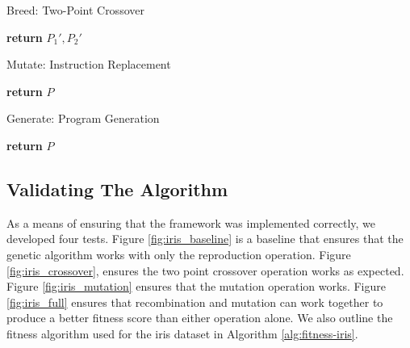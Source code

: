 \documentclass[12pt, final]{dalcsthesis}
\begin{document}
\begin{algorithm}[hb]
	\caption{Breed: Two-Point Crossover}
	\label{alg:breed}
	\begin{algorithmic}[1]
		\State \textbf{return} $P_1', P_2'$
	\end{algorithmic}
\end{algorithm}

\begin{algorithm}[hb]
	\caption{Mutate: Instruction Replacement}
	\label{alg:mutate}
	\begin{algorithmic}[1]
		\EndIf
		\EndFor
		\State \textbf{return} $P$
	\end{algorithmic}
\end{algorithm}

\begin{algorithm}[hb]
	\caption{Generate: Program Generation}
	\label{alg:generate}
	\begin{algorithmic}[1]
		\State \textbf{return} $P$
	\end{algorithmic}
\end{algorithm}

\subsection{Validating The Algorithm}
As a means of ensuring that the framework was implemented correctly, we developed four tests.
Figure \ref{fig:iris_baseline} is a baseline that ensures that the genetic algorithm works with only the reproduction operation.
Figure \ref{fig:iris_crossover}, ensures the two point crossover operation works as expected.
Figure \ref{fig:iris_mutation} ensures that the mutation operation works.
Figure \ref{fig:iris_full} ensures that recombination and mutation can work together to produce a better fitness score than either operation alone.
We also outline the fitness algorithm used for the iris dataset in Algorithm \ref{alg:fitness-iris}.
\end{document}
